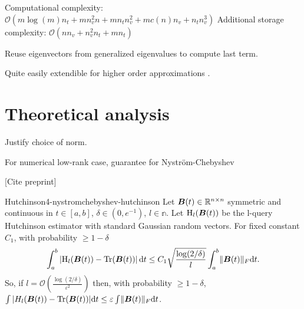Computational complexity: $\mathcal{O}(m \log(m) n_t + m n_v^2 n + m n_t n_v^2 +  m c(n) n_v + n_t n_v^3)$
Additional storage complexity: $\mathcal{O}(n n_v + n_v^2 n_t + m n_t)$

Reuse eigenvectors from generalized eigenvalues to compute last term.

Quite easily extendible for higher order approximations .


\section{Theoretical analysis}
\label{sec:4-nystromchebyshev-analysis}

Justify choice of norm.

For numerical low-rank case, guarantee for Nystr\"om-Chebyshev \cite[Theorem~9]{kressner2023randomized}

[Cite preprint]

\begin{lemma}{Hutchinson}{4-nystromchebyshev-hutchinson}
    Let $\boldsymbol{B}(t) \in \mathbb{R}^{n \times n}$ symmetric and continuous in $t \in [a, b]$, $\delta \in (0, e^{-1})$, $l \in \mathbb{n}$. Let $\operatorname{H}_{l}(\boldsymbol{B}(t))$ be the l-query Hutchinson estimator with standard Gaussian random vectors. For fixed constant $C_1$, with probability $\geq 1 - \delta$
    \begin{equation}
        \int_{a}^{b} \left| \operatorname{H}_{l}(\boldsymbol{B}(t))  - \operatorname{Tr}(\boldsymbol{B}(t)) \right| \mathrm{d}t \leq C_1 \sqrt{\frac{\log(2/\delta)}{l}} \int_{a}^{b} \lVert \boldsymbol{B}(t) \rVert_F \mathrm{d}t.
    \end{equation}
    So, if $l = \mathcal{O}\left( \frac{\log(2/\delta)}{\varepsilon^2} \right)$ then, with probability $\geq 1 - \delta$, $\int |H_l(\boldsymbol{B}(t)) - \operatorname{Tr}(\boldsymbol{B}(t))| \mathrm{d}t \leq \varepsilon \int \lVert \boldsymbol{B}(t) \rVert_F \mathrm{d}t$.
\end{lemma}

